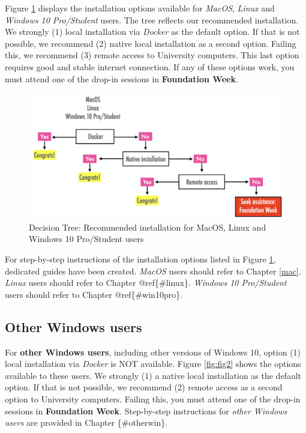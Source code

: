 \documentclass[
]{book}
\begin{document}
Figure \ref{fig:fig1} displays the installation options available for \emph{MacOS}, \emph{Linux} and \emph{Windows 10 Pro/Student} users. The tree reflects our recommended installation. We strongly (1) local installation via \emph{Docker} as the default option. If that is not possible, we recommend (2) native local installation as a second option. Failing this, we recommend (3) remote access to University computers. This last option requires good and stable internet connection. If any of these options work, you must attend one of the drop-in sessions in \textbf{Foundation Week}.

\begin{figure}

{\centering \includegraphics[width=20.39in]{figs/mac_linux_win10} 

}

\caption{Decision Tree: Recommended installation for MacOS, Linux and Windows 10 Pro/Student users}\label{fig:fig1}
\end{figure}

For step-by-step instructions of the installation options listed in Figure \ref{fig:fig1}, dedicated guides have been created. \emph{MacOS} users should refer to Chapter \ref{mac}. \emph{Linux} users should refer to Chapter @ref\{\#linux\}. \emph{Windows 10 Pro/Student} users should refer to Chapter @ref\{\#win10pro\}.

\hypertarget{other-windows-users}{%
\subsection{Other Windows users}\label{other-windows-users}}

For \textbf{other Windows users}, including other versions of Windows 10, option (1) local installation via \emph{Docker} is NOT available. Figure \ref{fig:fig2} shows the options available to these users. We strongly (1) a native local installation as the default option. If that is not possible, we recommend (2) remote access as a second option to University computers. Failing this, you must attend one of the drop-in sessions in \textbf{Foundation Week}. Step-by-step instructions for \emph{other Windows users} are provided in Chapter \{\#otherwin\}.
\end{document}
